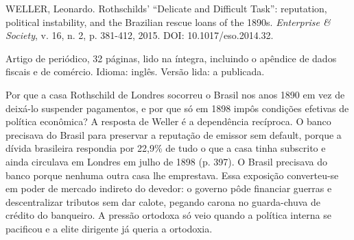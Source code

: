 
\begin{identificacao}
WELLER, Leonardo. Rothschilds' ``Delicate and Difficult Task'': reputation,
political instability, and the Brazilian rescue loans of the 1890s.
\textit{Enterprise \& Society}, v. 16, n. 2, p. 381-412, 2015.
DOI: 10.1017/eso.2014.32.

\smallskip
Artigo de periódico, 32 páginas, lido na íntegra, incluindo o apêndice de dados
fiscais e de comércio. Idioma: inglês. Versão lida: a publicada.
\end{identificacao}


Por que a casa Rothschild de Londres socorreu o Brasil nos anos 1890 em vez de
deixá-lo suspender pagamentos, e por que só em 1898 impôs condições efetivas de
política econômica? A resposta de Weller é a dependência recíproca. O banco
precisava do Brasil para preservar a reputação de emissor sem default, porque a
dívida brasileira respondia por 22,9\% de tudo o que a casa tinha subscrito e
ainda circulava em Londres em julho de 1898 (p. 397). O Brasil precisava do
banco porque nenhuma outra casa lhe emprestava. Essa exposição converteu-se em
poder de mercado indireto do devedor: o governo pôde financiar guerras e
descentralizar tributos sem dar calote, pegando carona no guarda-chuva de
crédito do banqueiro. A pressão ortodoxa só veio quando a política interna se
pacificou e a elite dirigente já queria a ortodoxia.



